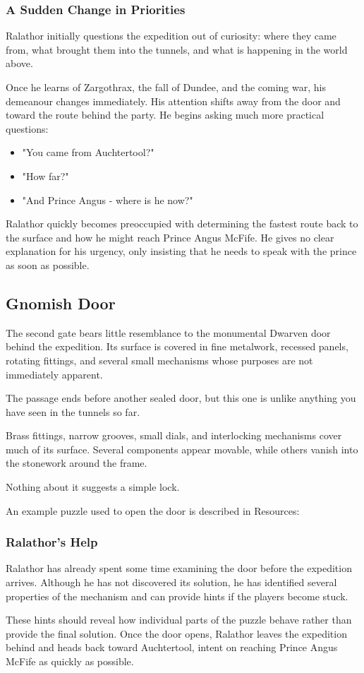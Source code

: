 \subsubsection*{A Sudden Change in Priorities}
{\entryfont Ralathor initially questions the expedition out of curiosity: where they came from, what brought them into the tunnels, and what is happening in the world above.

Once he learns of Zargothrax, the fall of Dundee, and the coming war, his demeanour changes immediately. His attention shifts away from the door and toward the route behind the party. He begins asking much more practical questions:
\begin{itemize}
	\item "You came from Auchtertool?"
	\item "How far?"
	\item "And Prince Angus - where is he now?"
\end{itemize}
Ralathor quickly becomes preoccupied with determining the fastest route back to the surface and how he might reach Prince Angus McFife. He gives no clear explanation for his urgency, only insisting that he needs to speak with the prince as soon as possible.}
\subsection*{ Gnomish Door}
{\entryfont The second gate bears little resemblance to the monumental Dwarven door behind the expedition. Its surface is covered in fine metalwork, recessed panels, rotating fittings, and several small mechanisms whose purposes are not immediately apparent.}
\begin{DndReadAloud}
	The passage ends before another sealed door, but this one is unlike anything you have seen in the tunnels so far.

	Brass fittings, narrow grooves, small dials, and interlocking mechanisms cover much of its surface. Several components appear movable, while others vanish into the stonework around the frame.

	Nothing about it suggests a simple lock.
\end{DndReadAloud}
{\noindent\entryfont An example puzzle used to open the door is described in Resources: \hyperref[ex:GnomePuzzle]{}}
\subsubsection*{Ralathor's Help}
{\entryfont Ralathor has already spent some time examining the door before the expedition arrives. Although he has not discovered its solution, he has identified several properties of the mechanism and can provide hints if the players become stuck.

These hints should reveal how individual parts of the puzzle behave rather than provide the final solution. Once the door opens, Ralathor leaves the expedition behind and heads back toward Auchtertool, intent on reaching Prince Angus McFife as quickly as possible.}
